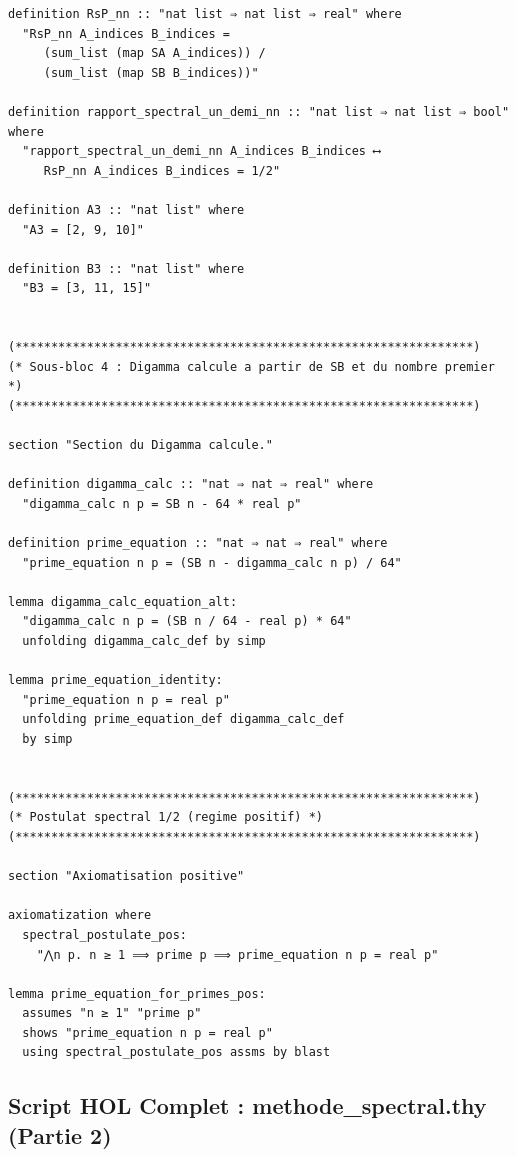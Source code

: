 \documentclass[a4paper,11pt]{article}
\begin{document}
\begin{holcode}[title={\textcolor{white}{Fichier : methode\_spectral.thy -- Partie 1/4}}]
\begin{lstlisting}
definition RsP_nn :: "nat list ⇒ nat list ⇒ real" where
  "RsP_nn A_indices B_indices =
     (sum_list (map SA A_indices)) /
     (sum_list (map SB B_indices))"

definition rapport_spectral_un_demi_nn :: "nat list ⇒ nat list ⇒ bool" where
  "rapport_spectral_un_demi_nn A_indices B_indices ⟷
     RsP_nn A_indices B_indices = 1/2"

definition A3 :: "nat list" where
  "A3 = [2, 9, 10]"

definition B3 :: "nat list" where
  "B3 = [3, 11, 15]"


(****************************************************************)
(* Sous-bloc 4 : Digamma calcule a partir de SB et du nombre premier *)
(****************************************************************)

section "Section du Digamma calcule."

definition digamma_calc :: "nat ⇒ nat ⇒ real" where
  "digamma_calc n p = SB n - 64 * real p"

definition prime_equation :: "nat ⇒ nat ⇒ real" where
  "prime_equation n p = (SB n - digamma_calc n p) / 64"

lemma digamma_calc_equation_alt:
  "digamma_calc n p = (SB n / 64 - real p) * 64"
  unfolding digamma_calc_def by simp

lemma prime_equation_identity:
  "prime_equation n p = real p"
  unfolding prime_equation_def digamma_calc_def
  by simp


(****************************************************************)
(* Postulat spectral 1/2 (regime positif) *)
(****************************************************************)

section "Axiomatisation positive"

axiomatization where
  spectral_postulate_pos:
    "⋀n p. n ≥ 1 ⟹ prime p ⟹ prime_equation n p = real p"

lemma prime_equation_for_primes_pos:
  assumes "n ≥ 1" "prime p"
  shows "prime_equation n p = real p"
  using spectral_postulate_pos assms by blast
\end{lstlisting}
\end{holcode}

\newpage
\subsection{Script HOL Complet : methode\_spectral.thy (Partie 2)}
\end{document}
